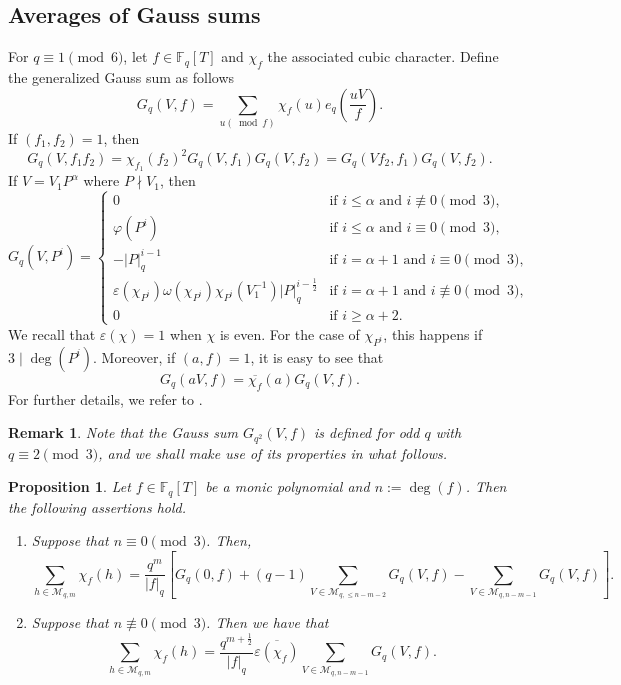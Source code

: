 \documentclass[table]{amsart}
\newtheorem{remark}[theorem]{Remark}
\newtheorem{proposition}[theorem]{Proposition}
\newcommand{\F}{\mathbb{F}}
\newcommand{\op}[1]{\operatorname{#1}}
\numberwithin{equation}{section}
\begin{document}
\subsection{Averages of Gauss sums}
\par For $q\equiv 1\pmod{6}$, let $f\in \F_q[T]$ and $\chi_f$ the associated cubic character. Define the generalized Gauss sum as follows
\begin{equation*}
G_{q}(V, f)=\sum_{u(\bmod f)} \chi_{f}(u) e_{q}\left(\frac{u V}{f}\right).
\end{equation*}
If \( (f_1, f_2) = 1 \), then  
\[
G_q(V, f_1 f_2) = \chi_{f_1}(f_2)^2 G_q(V, f_1) G_q(V, f_2) = G_q(V f_2, f_1) G_q(V, f_2).
\]  
If \( V = V_1 P^\alpha \) where \( P \nmid V_1 \), then  
\[
G_q(V, P^i) =  
\begin{cases}  
0 & \text{if } i \leq \alpha \text{ and } i \not\equiv 0 \pmod{3}, \\  
\varphi(P^i) & \text{if } i \leq \alpha \text{ and } i \equiv 0 \pmod{3}, \\  
-|P|_q^{i-1} & \text{if } i = \alpha+1 \text{ and } i \equiv 0 \pmod{3}, \\  
\varepsilon(\chi_{P^i}) \omega(\chi_{P^i}) \chi_{P^i}(V_1^{-1}) |P|_q^{i-\frac{1}{2}} & \text{if } i = \alpha+1 \text{ and } i \not\equiv 0 \pmod{3}, \\  
0 & \text{if } i \geq \alpha+2.
\end{cases}  
\]  
\noindent We recall that \( \varepsilon(\chi) = 1 \) when \( \chi \) is even. For the case of \( \chi_{P^i} \), this happens if \( 3 \mid \deg(P^i) \). Moreover, if $(a, f)=1$, it is easy to see that
\begin{equation}\label{gauss sum relation}
G_{q}(a V, f)=\overline{\chi_f}(a) G_{q}(V, f).
\end{equation}
For further details, we refer to \cite[Lemma 2.12]{DFLCubic}.
\begin{remark}
    Note that the Gauss sum $G_{q^2}(V, f)$ is defined for odd $q$ with $q \equiv 2 \pmod{3}$, and we shall make use of its properties in what follows. 
\end{remark}


\begin{proposition}
     Let $f\in \mathbb{F}_{q}[T]$ be a monic polynomial and $n:=\op{deg}(f)$. Then the following assertions hold.
     \begin{enumerate}
         \item Suppose that $n\equiv 0\pmod{3}$. Then, $$
\sum_{h \in \mathcal{M}_{q, m}} \chi_{f}(h)=\frac{q^{m}}{|f|_{q}}\left[G_{q}(0, f)+(q-1) \sum_{V \in \mathcal{M}_{q, \leq n-m-2}} G_{q}(V, f)-\sum_{V \in \mathcal{M}_{q, n-m-1}} G_{q}(V, f)\right] .
$$
\item Suppose that $n\not \equiv 0\pmod{3}$. Then we have that $$
\sum_{h \in \mathcal{M}_{q, m}} \chi_{f}(h)=\frac{q^{m+\frac{1}{2}}}{|f|_{q}} \overline{\varepsilon\left(\chi_{f}\right)} \sum_{V \in \mathcal{M}_{q, n-m-1}} G_{q}(V, f).
$$
     \end{enumerate}


\end{proposition}
\end{document}
